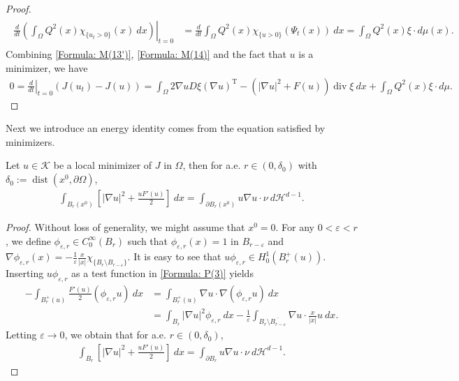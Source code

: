 \documentclass[11pt,reqno]{amsart}
\begin{document}
\begin{proof}
\begin{align}
\begin{alignedat}{2}
            \frac{d}{dt}\left.\left(\int_{\Omega}Q^{2}(x)\chi_{\{u_{t}>0\}}(x)\:dx\right)\right|_{t=0}&=\frac{d}{dt}\int_{\Omega}Q^{2}(x)\chi_{\{u>0\}}(\Psi_{t}(x))\:dx=\int_{\Omega}Q^{2}(x)\xi\cdot d\mu(x).
       \end{alignedat}
    \end{align}
    Combining \eqref{Formula: M(13')}, \eqref{Formula: M(14)} and the fact that $u$ is a minimizer, we have
    \begin{align*}
    	0=\left.\frac{d}{dt}\right|_{t=0}(J(u_{t})-J(u))=\int_{\Omega}2\nabla uD\xi(\nabla u)^{\mathrm{T}}-(|\nabla u|^{2}+F(u))\operatorname{div}\xi\:dx+\int_{\Omega}Q^{2}(x)\xi\cdot d\mu.
    \end{align*}
\end{proof}
Next we introduce an energy identity comes from the equation satisfied by minimizers.
\begin{lemma}\label{Lemma: Energy identity}
	Let $u\in\mathcal{K}$ be a local minimizer of $J$ in $\Omega$, then for a.e. $r\in(0,\delta_{0})$ with $\delta_{0}:=\operatorname{dist}(x^{0},\partial\Omega)$,
	\begin{align}\label{Formula: M(15)}
		\int_{B_{r}(x^{0})}\left[|\nabla u|^{2}+\frac{uF'(u)}{2}\right]\:dx=\int_{\partial B_{r}(x^{0})}u\nabla u\cdot\nu\:d\mathcal{H}^{d-1}.
	\end{align}
\end{lemma}
\begin{proof}
	Without loss of generality, we might assume that $x^{0}=0$. For any $0<\varepsilon<r$, we define $\phi_{\varepsilon,r}\in C_{0}^{\infty}(B_{r})$ such that $\phi_{\varepsilon,r}(x)=1$ in $B_{r-\varepsilon}$ and $\nabla\phi_{\varepsilon,r}(x)=-\frac{1}{\varepsilon}\frac{x}{|x|}\chi_{\{B_{r}\setminus B_{r-\varepsilon}\}}$. It is easy to see that $u\phi_{\varepsilon,r}\in H_{0}^{1}(B_{r}^{+}(u))$. Inserting $u\phi_{\varepsilon,r}$ as a test function in \eqref{Formula: P(3)} yields
	\begin{align*}
		-\int_{B_{r}^{+}(u)}\frac{F'(u)}{2}(\phi_{\varepsilon,r}u)\:dx&=\int_{B_{r}^{+}(u)}\nabla u\cdot\nabla(\phi_{\varepsilon,r}u)\:dx\\
		&=\int_{B_{r}}|\nabla u|^{2}\phi_{\varepsilon,r}\:dx-\frac{1}{\varepsilon}\int_{B_{r}\setminus\overline{B_{r-\varepsilon}}}\nabla u\cdot\frac{x}{|x|}u\:dx.
	\end{align*}
	Letting $\varepsilon\to0$, we obtain that for a.e. $r\in(0,\delta_{0})$,
	\begin{align*}
		\int_{B_{r}}\left[|\nabla u|^{2}+\frac{uF'(u)}{2}\right]\:dx=\int_{\partial B_{r}}u\nabla u\cdot\nu\:d\mathcal{H}^{d-1}.
	\end{align*}
\end{proof}
\end{document}
